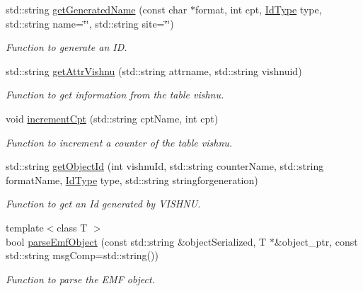 \begin{DoxyCompactItemize}
std::string \hyperlink{namespacevishnu_a1ac2452cabb31484e501d0e568a342c3}{getGeneratedName} (const char $\ast$format, int cpt, \hyperlink{namespacevishnu_aff8a694c2bc2b55465a31b4bf00f58c1}{IdType} type, std::string name=\char`\"{}\char`\"{}, std::string site=\char`\"{}\char`\"{})
\begin{DoxyCompactList}\small\item\em Function to generate an ID. \item\end{DoxyCompactList}\item 
std::string \hyperlink{namespacevishnu_a0adf01cdd878372e5fb44b3f1d9d86be}{getAttrVishnu} (std::string attrname, std::string vishnuid)
\begin{DoxyCompactList}\small\item\em Function to get information from the table vishnu. \item\end{DoxyCompactList}\item 
void \hyperlink{namespacevishnu_a999d6bcb9346a8b398d5c94eb01a125a}{incrementCpt} (std::string cptName, int cpt)
\begin{DoxyCompactList}\small\item\em Function to increment a counter of the table vishnu. \item\end{DoxyCompactList}\item 
std::string \hyperlink{namespacevishnu_a9349617bc14f92c6dfe67745dcbac8ff}{getObjectId} (int vishnuId, std::string counterName, std::string formatName, \hyperlink{namespacevishnu_aff8a694c2bc2b55465a31b4bf00f58c1}{IdType} type, std::string stringforgeneration)
\begin{DoxyCompactList}\small\item\em Function to get an Id generated by VISHNU. \item\end{DoxyCompactList}\item 
{\footnotesize template$<$class T $>$ }\\bool \hyperlink{namespacevishnu_a864d60dc9a2f4fe9048e522718698e84}{parseEmfObject} (const std::string \&objectSerialized, T $\ast$\&object\_\-ptr, const std::string msgComp=std::string())
\begin{DoxyCompactList}\small\item\em Function to parse the EMF object. \item\end{DoxyCompactList}\item 

\end{DoxyCompactItemize}
